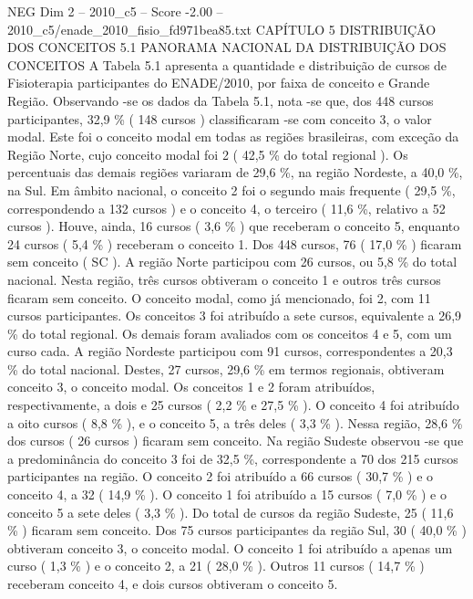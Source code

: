 \begin{textsample}{NEG Dim 2 – 2010\_c5 – Score -2.00 – 2010\_c5/enade\_2010\_fisio\_fd971bea85.txt}  \label{ex:f2_neg_109}
CAPÍTULO 5 DISTRIBUIÇÃO DOS CONCEITOS 5.1 PANORAMA NACIONAL DA DISTRIBUIÇÃO DOS CONCEITOS A Tabela 5.1 apresenta a quantidade e distribuição de cursos de Fisioterapia participantes do ENADE/2010, por faixa de conceito e Grande Região.
Observando -se os dados da Tabela 5.1, nota -se que, dos 448 cursos participantes, 32,9 \% ( 148 cursos ) classificaram -se com conceito 3, o valor modal.
Este foi o conceito modal em todas as regiões brasileiras, com exceção da Região Norte, cujo conceito modal foi 2 ( 42,5 \% do total regional ).
Os percentuais das demais regiões variaram de 29,6 \%, na região Nordeste, a 40,0 \%, na Sul.
Em âmbito nacional, o conceito 2 foi o segundo mais frequente ( 29,5 \%, correspondendo a 132 cursos ) e o conceito 4, o terceiro ( 11,6 \%, relativo a 52 cursos ).
Houve, ainda, 16 cursos ( 3,6 \% ) que receberam o conceito 5, enquanto 24 cursos ( 5,4 \% ) receberam o conceito 1.
Dos 448 cursos, 76 ( 17,0 \% ) ficaram sem conceito ( SC ).
A região Norte participou com 26 cursos, ou 5,8 \% do total nacional.
Nesta região, três cursos obtiveram o conceito 1 e outros três cursos ficaram sem conceito.
O conceito modal, como já mencionado, foi 2, com 11 cursos participantes.
Os conceitos 3 foi atribuído a sete cursos, equivalente a 26,9 \% do total regional.
Os demais foram avaliados com os conceitos 4 e 5, com um curso cada.
A região Nordeste participou com 91 cursos, correspondentes a 20,3 \% do total nacional.
Destes, 27 cursos, 29,6 \% em termos regionais, obtiveram conceito 3, o conceito modal.
Os conceitos 1 e 2 foram atribuídos, respectivamente, a dois e 25 cursos ( 2,2 \% e 27,5 \% ).
O conceito 4 foi atribuído a oito cursos ( 8,8 \% ), e o conceito 5, a três deles ( 3,3 \% ).
Nessa região, 28,6 \% dos cursos ( 26 cursos ) ficaram sem conceito.
Na região Sudeste observou -se que a predominância do conceito 3 foi de 32,5 \%, correspondente a 70 dos 215 cursos participantes na região.
O conceito 2 foi atribuído a 66 cursos ( 30,7 \% ) e o conceito 4, a 32 ( 14,9 \% ).
O conceito 1 foi atribuído a 15 cursos ( 7,0 \% ) e o conceito 5 a sete deles ( 3,3 \% ).
Do total de cursos da região Sudeste, 25 ( 11,6 \% ) ficaram sem conceito.
Dos 75 cursos participantes da região Sul, 30 ( 40,0 \% ) obtiveram conceito 3, o conceito modal.
O conceito 1 foi atribuído a apenas um curso ( 1,3 \% ) e o conceito 2, a 21 ( 28,0 \% ).
Outros 11 cursos ( 14,7 \% ) receberam conceito 4, e dois cursos obtiveram o conceito 5.

\end{textsample}
